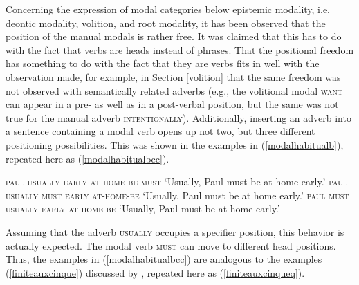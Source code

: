 Concerning the expression of modal categories below epistemic modality, i.e. deontic modality, volition, and root modality, it has been observed that the position of the manual modals is rather free. It was claimed that this has to do with the fact that verbs are heads instead of phrases. That the positional freedom has something to do with the fact that they are verbs fits in well with the observation made, for example, in Section \ref{volition} that the same freedom was not observed with semantically related adverbs (e.g., the volitional modal \textsc{want} can appear in a pre- as well as in a post-verbal position, but the same was not true for the manual adverb \textsc{intentionally}). Additionally, inserting an adverb into a sentence containing a modal verb opens up not two, but three different positioning possibilities. This was shown in the examples in (\ref{modalhabitualb}), repeated here as (\ref{modalhabitualbcc}).

\begin{exe}
\ex\label{modalhabitualbcc}\begin{xlist} 
\ex \textsc{paul usually early at-home-be must}
\glt `Usually, Paul must be at home early.'
\ex \textsc{paul usually must early at-home-be}
\glt `Usually, Paul must be at home early.'
\ex \textsc{paul must usually early at-home-be}
\glt `Usually, Paul must be at home early.'
\end{xlist}
\end{exe} 

\noindent Assuming that the adverb \textsc{usually} occupies a specifier position, this behavior is actually expected. The modal verb \textsc{must} can move to different head positions. Thus, the examples in (\ref{modalhabitualbcc}) are analogous to the examples (\ref{finiteauxcinque}) discussed by \citet[49]{cinque1999adverbs}, repeated here as (\ref{finiteauxcinqueq}). 

